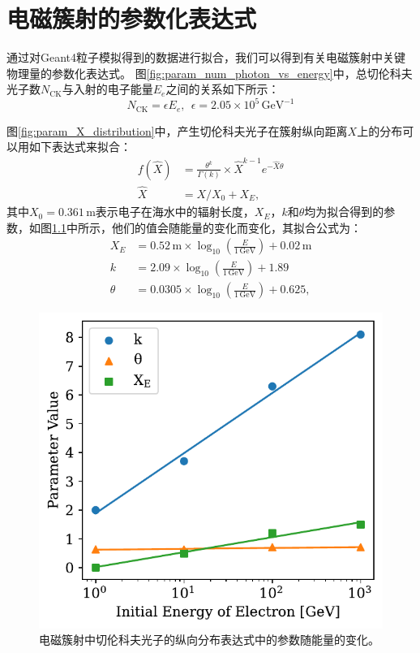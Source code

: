 \chapter{电磁簇射的参数化表达式}
\label{appendix:shower_param}

通过对Geant4粒子模拟得到的数据进行拟合，我们可以得到有关电磁簇射中关键物理量的参数化表达式。
图\ref{fig:param_num_photon_vs_energy}中，总切伦科夫光子数$N_\mathrm{CK}$与入射的电子能量$E_e$之间的关系如下所示：
\begin{equation}
    N_\mathrm{CK} = \epsilon E_e, ~~ 
    \epsilon = 2.05 \times 10^5 \,\mathrm{GeV^{-1}}
\end{equation}

图\ref{fig:param_X_distribution}中，产生切伦科夫光子在簇射纵向距离$X$上的分布可以用如下表达式来拟合：
\begin{equation}
\begin{aligned}
    f(\hat{X}) &= \frac{\theta^k}{\Gamma(k)} \times \hat{X}^{k-1} e^{-\hat{X} \theta} \\
    \hat{X} &= X / X_0 + X_E ,
\end{aligned}
\end{equation}
其中$X_0 = 0.361 \,\mathrm{m}$表示电子在海水中的辐射长度，$X_E$，$k$和$\theta$均为拟合得到的参数，如图\ref{fig:param_X_parameter}中所示，他们的值会随能量的变化而变化，其拟合公式为：
\begin{equation}
\begin{aligned}
    X_E &= 0.52 \,\mathrm{m} \times \log_{10}(\frac{E}{1\,\mathrm{GeV}}) + 0.02 \,\mathrm{m}  \\
    k &= 2.09 \times \log_{10}(\frac{E}{1\,\mathrm{GeV}}) + 1.89 \\
    \theta &= 0.0305 \times \log_{10}(\frac{E}{1\,\mathrm{GeV}}) + 0.625 ,
\end{aligned}
\end{equation}

\begin{figure}[htb]
    \centering
    \includegraphics[width=0.6\linewidth]{img/param_X_parameter.pdf}
    \caption{电磁簇射中切伦科夫光子的纵向分布表达式中的参数随能量的变化。}
    \label{fig:param_X_parameter}
\end{figure}

